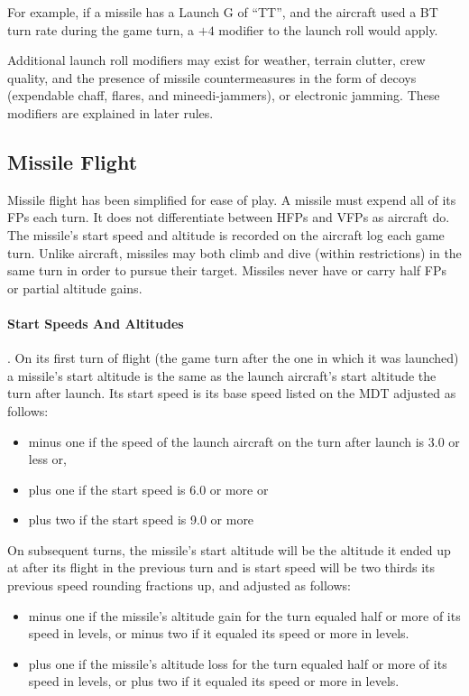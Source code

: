 For example, if a missile has a Launch G of “TT”, and the aircraft used a BT turn rate during the game turn, a $+4$ modifier to the launch roll would apply.

Additional launch roll modifiers may exist for weather, terrain clutter, crew quality, and the presence of missile countermeasures in the form of decoys (expendable chaff, flares, and mineedi-jammers), or electronic jamming. These modifiers are explained in later rules.

\subsection{Missile Flight}

Missile flight has been simplified for ease of play. A missile must expend all of its FPs each turn. It does not differentiate between HFPs and VFPs as aircraft do. The missile's start speed and altitude is recorded on the aircraft log each game turn. Unlike aircraft, missiles may both climb and dive (within restrictions) in the same turn in order to pursue their target. Missiles never have or carry half FPs or partial altitude gains.

\paragraph{Start Speeds And Altitudes}. On its first turn of flight (the game turn after the one in which it was launched) a missile's start altitude is the same as the launch aircraft's start altitude the turn after launch. Its start speed is its base speed listed on the MDT adjusted as follows:

\begin{itemize}

    \item minus one if the speed of the launch aircraft on the turn after launch is 3.0 or less or,

    \item plus one if the start speed is 6.0 or more or

    \item plus two if the start speed is 9.0 or more
\end{itemize}

On subsequent turns, the missile's start altitude will be the altitude it ended up at after its flight in the previous turn and is start speed will be two thirds its previous speed rounding fractions up, and adjusted as follows:

\begin{itemize}

    \item minus one if the missile's altitude gain for the turn equaled half or more of its speed in levels, or minus two if it equaled its speed or more in levels.

    \item plus one if the missile's altitude loss for the turn equaled half or more of its speed in levels, or plus two if it equaled its speed or more in levels.

\end{itemize}

